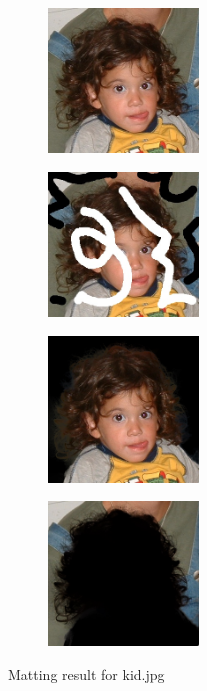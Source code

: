 \documentclass[11pt,letterpaper]{article}
\begin{document}
\begin{figure}[h!]
  \centering
  \begin{subfigure}{0.24\textwidth}
    \centering
    \includegraphics[width=4cm]{./result/kid/kid.jpg}
    \caption{}
  \end{subfigure}
  \begin{subfigure}{0.24\textwidth}
    \centering
    \includegraphics[width=4cm]{./result/kid/kid_m.jpg}
    \caption{}
  \end{subfigure}
  \begin{subfigure}{0.24\textwidth}
    \centering
    \includegraphics[width=4cm]{./result/kid/kid_foreground.jpg}
    \caption{}
  \end{subfigure}
  \begin{subfigure}{0.24\textwidth}
    \centering
    \includegraphics[width=4cm]{./result/kid/kid_background.jpg}
    \caption{}
  \end{subfigure}    
  \caption {Matting result for kid.jpg}
\end{figure}
\end{document}
